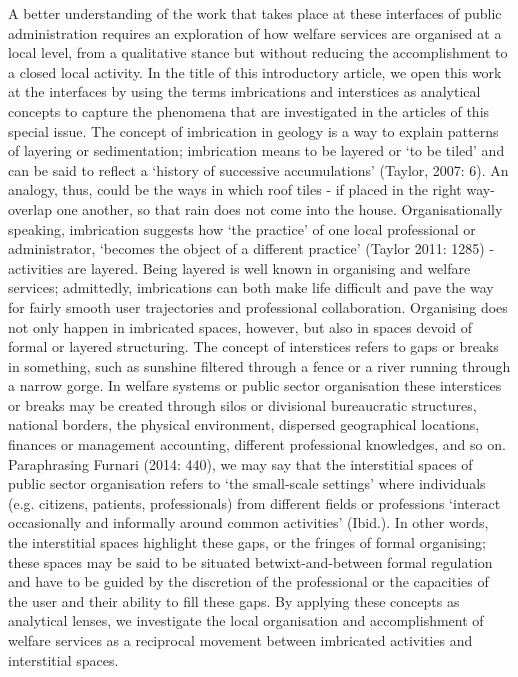 A better understanding of the work that takes place at these interfaces of public administration requires an exploration of how welfare services are organised at a local level, from a qualitative stance but without reducing the accomplishment to a closed local activity. In the title of this introductory article, we open this work at the interfaces by using the terms imbrications and interstices as analytical concepts to capture the phenomena that are investigated in the articles of this special issue. The concept of imbrication in geology is a way to explain patterns of layering or sedimentation; imbrication means to be layered or ‘to be tiled’ and can be said to reflect a ‘history of successive accumulations’ (Taylor, 2007: 6). An analogy, thus, could be the ways in which roof tiles - if placed in the right way- overlap one another, so that rain does not come into the house. Organisationally speaking, imbrication suggests how ‘the practice’ of one local professional or administrator, ‘becomes the object of a different practice’ (Taylor 2011: 1285) - activities are layered. Being layered is well known in organising and welfare services; admittedly, imbrications can both make life difficult and pave the way for fairly smooth user trajectories and professional collaboration. Organising does not only happen in imbricated spaces, however, but also in spaces devoid of formal or layered structuring. The concept of interstices refers to gaps or breaks in something, such as sunshine filtered through a fence or a river running through a narrow gorge. In welfare systems or public sector organisation these interstices or breaks may be created through silos or divisional bureaucratic structures, national borders, the physical environment, dispersed geographical locations, finances or management accounting, different professional knowledges, and so on. Paraphrasing Furnari (2014: 440), we may say that the interstitial spaces of public sector organisation refers to ‘the small-scale settings’ where individuals (e.g. citizens, patients, professionals) from different fields or professions ‘interact occasionally and informally around common activities’ (Ibid.). In other words, the interstitial spaces highlight these gaps, or the fringes of formal organising; these spaces may be said to be situated betwixt-and-between formal regulation and have to be guided by the discretion of the professional or the capacities of the user and their ability to fill these gaps. By applying these concepts as analytical lenses, we investigate the local organisation and accomplishment of welfare services as a reciprocal movement between imbricated activities and interstitial spaces.
